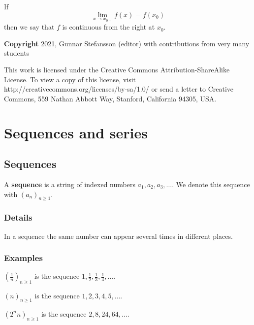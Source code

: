 \documentclass[12pt,a4paper]{article}
\theoremstyle{regla}
\theoremstyle{remark}
\theoremstyle{definition}
\theoremstyle{nonumberbreak}
\begin{document}
If 
$$\lim_{x \to x_{0+}} f(x)=f(x_0)
$$ 
then we say that $f$ is continuous from the right at $x_0$.


{\bf Copyright}
2021, Gunnar Stefansson (editor) with contributions from very many students

This work is licensed under the Creative Commons
Attribution-ShareAlike License. To view a copy of this license, visit
http://creativecommons.org/licenses/by-sa/1.0/ or send a letter to
Creative Commons, 559 Nathan Abbott Way, Stanford, California 94305,
USA.
\clearpage
\section{Sequences and series}
\subsection{Sequences}
\begin{fbox}
\begin{minipage}{0.97\textwidth}
A {\bf sequence} is a string of indexed numbers $a_1, a_2, a_3, \ldots$. We denote this sequence with $(a_n)_{n\geq1}$.

\end{minipage}
\end{fbox}
\subsubsection{Details}
In a sequence the same number can appear several times in different places.
\subsubsection{Examples}
\begin{xmpl}

$(\frac{1}{n})_{n\geq1}$ is the sequence $1,\frac{1}{2}, \frac{1}{3}, \frac{1}{4}, \ldots$.
\end{xmpl}
\begin{xmpl}

$(n)_{n\geq1}$ is the sequence $1,2,3,4,5,\ldots$.
\end{xmpl}
\begin{xmpl}

$(2^nn)_{n\geq1}$ is the sequence $2,8, 24, 64,\ldots$.
\end{xmpl}

\end{document}
